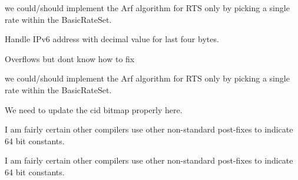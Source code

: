 \begin{DoxyRefList}
\item[\label{todo__todo000169}%
\hypertarget{todo__todo000169}{}%
Member \hyperlink{classns3_1_1ArfWifiManager_a56217b6af0b44febda8b48266562e284}{ns3\+:\+:Arf\+Wifi\+Manager\+:\+:Do\+Get\+Rts\+Tx\+Vector} (\hyperlink{structns3_1_1WifiRemoteStation}{Wifi\+Remote\+Station} $\ast$station)]we could/should implement the Arf algorithm for R\+TS only by picking a single rate within the Basic\+Rate\+Set.  
\item[\label{todo__todo000149}%
\hypertarget{todo__todo000149}{}%
Member \hyperlink{namespacens3_aba8266b47e04689cbaa4d1c34e68fedf}{ns3\+:\+:Ascii\+To\+Ipv6\+Host} (const char $\ast$address, uint8\+\_\+t addr\mbox{[}16\mbox{]})]Handle I\+Pv6 address with decimal value for last four bytes.  
\item[\label{todo__todo000181}%
\hypertarget{todo__todo000181}{}%
Member \hyperlink{classns3_1_1BSSchedulerSimple_ab0ef72a5223a70761910bcda7004f510}{ns3\+:\+:B\+S\+Scheduler\+Simple\+:\+:Schedule} (void)]Overflows but don\textquotesingle{}t know how to fix  
\item[\label{todo__todo000170}%
\hypertarget{todo__todo000170}{}%
Member \hyperlink{classns3_1_1CaraWifiManager_a2361885b5679a859cb55c0b29da0c1ad}{ns3\+:\+:Cara\+Wifi\+Manager\+:\+:Do\+Get\+Rts\+Tx\+Vector} (\hyperlink{structns3_1_1WifiRemoteStation}{Wifi\+Remote\+Station} $\ast$station)]we could/should implement the Arf algorithm for R\+TS only by picking a single rate within the Basic\+Rate\+Set.  
\item[\label{todo__todo000182}%
\hypertarget{todo__todo000182}{}%
Member \hyperlink{classns3_1_1CidFactory_af6d359632ff2bf72d15ace0d8a94b478}{ns3\+:\+:Cid\+Factory\+:\+:Free\+Cid} (\hyperlink{classns3_1_1Cid}{Cid} cid)]We need to update the cid bitmap properly here.  
\item[\label{todo__todo000004}%
\hypertarget{todo__todo000004}{}%
Member \hyperlink{classns3_1_1DefaultSimulatorImpl_aa12267176f85eba24d826c0f991a2ded}{ns3\+:\+:Default\+Simulator\+Impl\+:\+:Get\+Maximum\+Simulation\+Time} (void) const ]I am fairly certain other compilers use other non-\/standard post-\/fixes to indicate 64 bit constants.  
\item[\label{todo__todo000139}%
\hypertarget{todo__todo000139}{}%
Member \hyperlink{classns3_1_1DistributedSimulatorImpl_a09879f4ab9e765716a96b40900be4480}{ns3\+:\+:Distributed\+Simulator\+Impl\+:\+:Get\+Maximum\+Simulation\+Time} (void) const ]I am fairly certain other compilers use other non-\/standard post-\/fixes to indicate 64 bit constants.  

\end{DoxyRefList}
